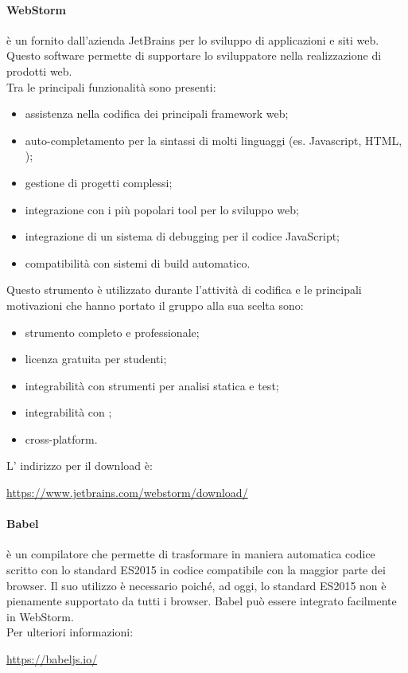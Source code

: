 				\paragraph{WebStorm} \label{sec:WebStorm}
				 è un  fornito dall'azienda JetBrains per lo sviluppo di applicazioni e siti web.
				Questo software permette di supportare lo sviluppatore nella realizzazione di prodotti web. \\
				Tra le principali funzionalità sono presenti:
				\begin{itemize}
					\item assistenza nella codifica dei principali framework web;
					\item auto-completamento per la sintassi di molti linguaggi (es. Javascript, HTML, );
					\item gestione di progetti complessi;
					\item integrazione con i più popolari tool per lo sviluppo web;
					\item integrazione di un sistema di debugging per il codice JavaScript;
					\item compatibilità con sistemi di build automatico.
				\end{itemize}
				Questo strumento è utilizzato durante l'attività di codifica e le principali motivazioni che hanno portato il gruppo alla sua scelta sono:
				\begin{itemize}
					\item strumento completo e professionale;
					\item licenza gratuita per studenti;
					\item integrabilità con strumenti per analisi statica e test;
					\item integrabilità con ;
					\item cross-platform.
				\end{itemize}
				L' indirizzo per il download è:
				\begin{center}
					\url{https://www.jetbrains.com/webstorm/download/}
				\end{center}
				\paragraph{Babel} \label{sec:Babel}
				 è un compilatore \js{} che permette di trasformare in maniera automatica codice scritto con lo standard ES2015 in codice compatibile con la maggior parte dei browser. Il suo utilizzo è necessario poiché, ad oggi, lo standard ES2015 non è pienamente supportato da tutti i browser. Babel può essere integrato facilmente in WebStorm.\\
				Per ulteriori informazioni:
				\begin{center}
					\url{https://babeljs.io/}
				\end{center}
